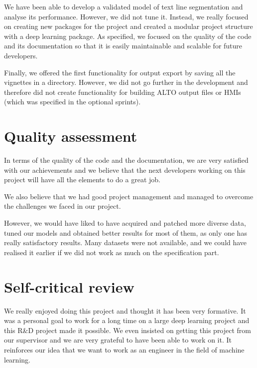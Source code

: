 \documentclass{polytech/polytech}
\numberwithin{figure}{chapter}
\begin{document}
We have been able to develop a validated model of text line segmentation and analyse its performance.
However, we did not tune it.
Instead, we really focused on creating new packages for the project and created a modular project structure with a deep learning package.
As specified, we focused on the quality of the code and its documentation so that it is easily maintainable and scalable for future developers.

Finally, we offered the first functionality for output export by saving all the vignettes in a directory.
However, we did not go further in the development and therefore did not create functionality for building ALTO output files or HMIs (which was specified in the optional sprints).

\section{Quality assessment}

In terms of the quality of the code and the documentation, we are very satisfied with our achievements and we believe that the next developers working on this project will have all the elements to do a great job.

We also believe that we had good project management and managed to overcome the challenges we faced in our project.

However, we would have liked to have acquired and patched more diverse data, tuned our models and obtained better results for most of them, as only one has really satisfactory results.
Many datasets were not available, and we could have realised it earlier if we did not work as much on the specification part.

\section{Self-critical review}

We really enjoyed doing this project and thought it has been very formative.
It was a personal goal to work for a long time on a large deep learning project and this R\&D project made it possible.
We even insisted on getting this project from our supervisor and we are very grateful to have been able to work on it.
It reinforces our idea that we want to work as an engineer in the field of machine learning.
\end{document}
